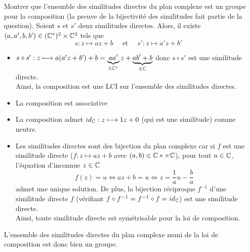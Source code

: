 \documentclass{article}
\date{05 octobre 2024}
\begin{document}
\maketitle
\begin{question_kholle}{Montrer que l'ensemble des similitudes directes du plan complexe est un groupe pour la composition (la preuve de la bijectivité des similitudes fait partie de la question).}
  Soient $s$ et $s'$ deux similitudes directes. Alors, il existe $(a,a',b,b')\in(\mathbb C^*)^2\times \mathbb C^2$ tels que
  \[
    s:z\longmapsto az+b \quad\text{ et }\quad s':z\longmapsto a'z+b'
  \]
  \begin{itemize}[label=$\star$]
    \item $s\circ s': z\longmapsto a(a'z+b')+b = \underbrace{aa'}_{\in\mathbb C^*}z+\underbrace{ab'+b}_{\in\mathbb C}$ donc $s\circ s'$ est une similitude directe.\\
          Ainsi, la composition est une LCI sur l'ensemble des similitudes directes.
    \item La composition est associative
    \item La composition admet $id_{\mathbb C}:z\longmapsto 1z+0$ (qui est une similitude) comme neutre.
    \item Les similitudes directes sont des bijection du plan complexe car si $f$ est une similitude directe ($f:z\longmapsto az+b$ avec $(a,b)\in\mathbb C*\times\mathbb C$), pour tout $u\in\mathbb C$, l'équation d'inconnue $z\in\mathbb C$
          \[
            f(z)=u \iff az+b=u \iff z=\frac{1}{a}u-\frac{b}{a}
          \]
          admet une unique solution. De plus, la bijection réciproque $f^{-1}$ d'une similitude directe $f$ (vérifiant $f\circ f^{-1} = f^{-1}\circ f = id_{\mathbb C}$) est une similitude directe.\\
          Ainsi, toute similitude directe est symétrisable pour la loi de composition.
  \end{itemize}
  L'ensemble des similitudes directes du plan complexe muni de la loi de composition est donc bien un groupe.
\end{question_kholle}
\end{document}
